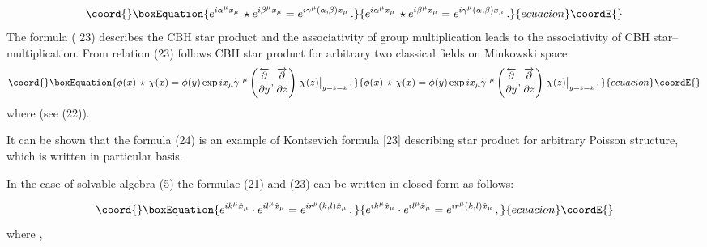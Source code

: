 \documentclass[a4paper,a4paper]{article}
\begin{document}
\begin{equation}\coord{}\boxEquation{
e^{i \alpha^{\mu} {x}_{\mu} } \, \star 
e^{i \beta ^{\mu}{x}_{\mu} } =
e^{i \gamma ^{\mu} (\alpha,\beta) {x}_{\mu} }\, .
     }{
e^{i \alpha^{\mu} {x}_{\mu} } \, \star 
e^{i \beta ^{\mu}{x}_{\mu} } =
e^{i \gamma ^{\mu} (\alpha,\beta) {x}_{\mu} }\, .
     }{ecuacion}\coordE{}\end{equation}     
The formula ( 23) describes the CBH star product and the
associativity of group multiplication leads to the associativity
of CBH star--multiplication. From relation  (23) follows CBH
star product for arbitrary two classical fields \coordHE{} on Minkowski space
\begin{equation}\coord{}\boxEquation{
\phi(x)\,  \star\,  \chi(x) =
\phi(y) \, \hbox{exp}\, i x_{\mu} {\widetilde{\gamma}}\ ^{\mu} 
\left( { \overleftarrow{\partial} \over \partial y} , 
{  \overrightarrow{\partial} 
 \over \partial z} \right) \, \chi(z)\big|_{y=z=x} \, ,
 }{
\phi(x)\,  \star\,  \chi(x) =
\phi(y) \, \hbox{exp}\, i x_{\mu} {\widetilde{\gamma}}\ ^{\mu} 
\left( { \overleftarrow{\partial} \over \partial y} , 
{  \overrightarrow{\partial} 
 \over \partial z} \right) \, \chi(z)\big|_{y=z=x} \, ,
 }{ecuacion}\coordE{}\end{equation}
 where \myHighlight{$ {{\gamma}} ^{\mu} (\alpha,\beta)=
 \alpha^{\mu} + \beta^{\mu} +
  {\widetilde{\gamma}}\ ^{\mu} (\alpha, \beta)$}\coordHE{} (see (22)).

 It can be shown that the formula (24) is an example of
Kontsevich formula [23]
 describing star product for arbitrary
Poisson structure, which is written in particular basis.

In the case of solvable algebra (5) the formulae (21) and
(23) can be written in closed form as follows:

\begin{equation}\coord{}\boxEquation{
e^{i k^{\mu} \hat{x}_{\mu} }
\cdot
e^{i l^{\mu} \hat{x}_{\mu} }
     =
     e^{i r^{\mu} (k,l)  \hat{x}_{\mu} }\, ,
     }{
e^{i k^{\mu} \hat{x}_{\mu} }
\cdot
e^{i l^{\mu} \hat{x}_{\mu} }
     =
     e^{i r^{\mu} (k,l)  \hat{x}_{\mu} }\, ,
     }{ecuacion}\coordE{}\end{equation}
     where
      \coordHE{},
\end{document}
